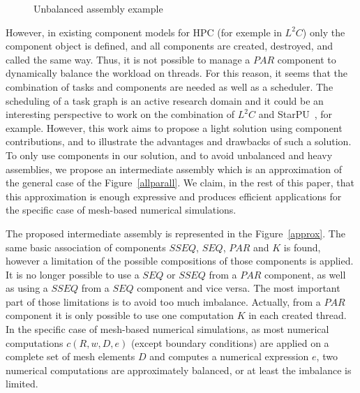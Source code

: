 \begin{figure}[h!]
\begin{center}
\caption{Unbalanced assembly example}
\label{unbalanced}
\end{center}
\end{figure}

However, in existing component models for HPC (for exemple in $L^2C$) only the component object is defined, and all components are created, destroyed, and called the same way. Thus, it is not possible to manage a $PAR$ component to dynamically balance the workload on threads. For this reason, it seems that the combination of tasks and components are needed as well as a scheduler. The scheduling of a task graph is an active research domain and it could be an interesting perspective to work on the combination of $L^2C$ and StarPU~\cite{}, for example. However, this work aims to propose a light solution using component contributions, and to illustrate the advantages and drawbacks of such a solution. To only use components in our solution, and to avoid unbalanced and heavy assemblies, we propose an intermediate assembly which is an approximation of the general case of the Figure~\ref{allparall}. We claim, in the rest of this paper, that this approximation is enough expressive and produces efficient applications for the specific case of mesh-based numerical simulations.

The proposed intermediate assembly is represented in the Figure~\ref{approx}. The same basic association of components $SSEQ$, $SEQ$, $PAR$ and $K$ is found, however a limitation of the possible compositions of those components is applied. It is no longer possible to use a $SEQ$ or $SSEQ$ from a $PAR$ component, as well as using a $SSEQ$ from a $SEQ$ component and vice versa. The most important part of those limitations is to avoid too much imbalance. Actually, from a $PAR$ component it is only possible to use one computation $K$ in each created thread. In the specific case of mesh-based numerical simulations, as most numerical computations $c(R,w,D,e)$ (except boundary conditions) are applied on a complete set of mesh elements $D$ and computes a numerical expression $e$, two numerical computations are approximately balanced, or at least the imbalance is limited.

